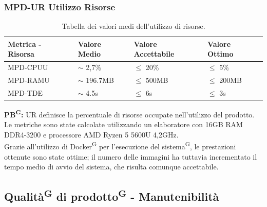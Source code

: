 \documentclass[8pt]{article}
\newcommand{\glossterm}[1]{#1\textsuperscript{G}} %
\begin{document}
\subsubsection{MPD-UR Utilizzo Risorse}
\renewcommand{\arraystretch}{2.5}
\begin{longtable}{|>{\centering}p{3.5cm}|>{\centering\arraybackslash}p{3cm}|>{\centering\arraybackslash}p{3.5cm}|>{\centering\arraybackslash}p{3cm}|}
    \hline
    \rowcolor{white}
    \textbf{Metrica - Risorsa} & \textbf{Valore Medio} & \textbf{Valore Accettabile} & \textbf{Valore Ottimo} \\
    \hline
    \endfirsthead 
    \rowcolor{white}
    \caption{Tabella dei valori medi dell'utilizzo di risorse.} 
    \label{table:Tabella dei valori medi dell'utilizzo di risorse}
    \endlastfoot 
    MPD-CPUU & $\sim$ 2,7\% & $\leq$ 20\% & $\leq$ 5\% \\
    \hline 
    MPD-RAMU & $\sim$ 196.7MB & $\leq$ 500MB & $\leq$ 200MB \\
    \hline 
    MPD-TDE & $\sim$ 4.5s & $\leq$ 6s & $\leq$ 3s \\
    \hline
\end{longtable}
\textbf{\glossterm{PB}:} UR definisce la percentuale di risorse occupate nell'utilizzo del prodotto. Le metriche sono state calcolate utilizzando un elaboratore con 16GB RAM DDR4-3200 e processore AMD Ryzen 5 5600U 4,2GHz.\\ Grazie all'utilizzo di \glossterm{Docker} per l'esecuzione del \glossterm{sistema}, le prestazioni ottenute sono state ottime; il numero delle immagini ha tuttavia incrementato il tempo medio di avvio del sistema, che risulta comunque accettabile.
\subsection{\glossterm{Qualità} di \glossterm{prodotto} - Manutenibilità}
\end{document}
